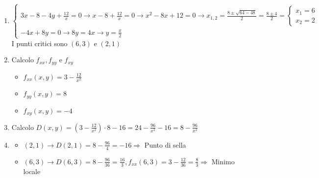 \documentclass[10pt, a4paper]{article}
\begin{document}
\begin{enumerate}
\begin{enumerate}
            \item \begin{equation*}
                \begin{cases}
                    3x-8-4y+\frac{12}{x}=0 \rightarrow x-8+\frac{12}{x}=0\rightarrow x^2-8x+12=0\rightarrow x_{1,2}=\frac{8\pm\sqrt{64-48}}{2}=\frac{8\pm 4}{2}=\begin{cases}
                        x_1=6\\
                        x_2=2
                    \end{cases}\\
                    -4x+8y=0 \rightarrow 8y=4x \rightarrow y=\frac{x}{2}
                \end{cases}
            \end{equation*}
            I punti critici sono $(6,3)$ e $(2,1)$
            \item Calcolo $f_{xx}, f_{yy} \text{ e } f_{xy}$ \begin{itemize}
                \item $f_{xx}(x,y)=3-\frac{12}{x^2}$
                \item $f_{yy}(x,y)=8$
                \item $f_{xy}(x,y)=-4$
            \end{itemize}
            \item Calcolo $D(x,y)=\left(3-\frac{12}{x^2}\right)\cdot 8-16=24-\frac{96}{x^2}-16=8-\frac{96}{x^2}$
            \item \begin{itemize}
                \item $(2,1)\rightarrow D(2,1)=8-\frac{96}{4}=-16 \Rightarrow$ Punto di sella
                \item $(6,3)\rightarrow D(6,3)=8-\frac{96}{36}=\frac{16}{3}, f_{xx}(6,3)=3-\frac{12}{36}=\frac{8}{3}\Rightarrow$ Minimo locale
            \end{itemize}
        \end{enumerate}
    \end{enumerate}
\end{document}
